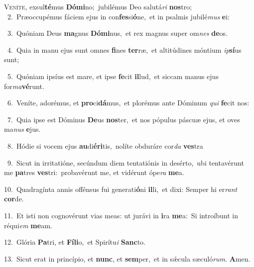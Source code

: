 \lettrine{\initial\textcolor{\initialcolor}{V}}{eníte,} exsul\-\textbf{té}\-mus \textbf{Dó}\-\textbf{mi}no;~\star jubilémus Deo salutá\textit{ri} \textbf{nos}\-tro;\\
{\numbfont\textcolor{\numbcolor}{~2.}}~Præoccupémus fáciem ejus in con\-\textbf{fes}\-si\-\textbf{ó}\-ne,~\star et in psalmis jubilé\textit{mus} \textbf{e}\-i:\par
{\numbfont\textcolor{\numbcolor}{~3.}}~Quóniam Deus \textbf{ma}\-gnus \textbf{Dó}\-\textbf{mi}nus,~\star et rex magnus super om\textit{nes} \textbf{de}\-os.\par
{\numbfont\textcolor{\numbcolor}{~4.}}~Quia in manu ejus sunt omnes \textbf{fi}\-nes \textbf{ter}\-ræ,~\star et altitúdines móntium \textit{ip}\-\textbf{sí}us sunt;\par
{\numbfont\textcolor{\numbcolor}{~5.}}~Quóniam ipsíus est mare, et ipse \textbf{fe}\-cit \textbf{il}\-lud,~\star et siccam manus ejus for\-\textit{ma}\-\textbf{vé}runt.\par
{\numbfont\textcolor{\numbcolor}{~6.}}~Veníte, adorémus, et \textbf{pro}\-ci\-\textbf{dá}\-mus,~\star et plorémus ante Dóminum \textit{qui} \textbf{fe}\-cit nos:\par
{\numbfont\textcolor{\numbcolor}{~7.}}~Quia ipse est Dóminus \textbf{De}\-us \textbf{nos}\-ter,~\star et nos pópulus páscuæ ejus, et oves ma\textit{nus} \textbf{e}\-jus.\par
{\numbfont\textcolor{\numbcolor}{~8.}}~Hódie si vocem ejus \textbf{au}\-di\-\textbf{é}\-\textbf{ri}tis,~\star nolíte obduráre cor\textit{da} \textbf{ves}\-tra\par
{\numbfont\textcolor{\numbcolor}{~9.}}~Sicut in irritatióne, secúndum diem tentatiónis in desérto,~\dagger ubi tentavérunt me \textbf{pa}\-tres \textbf{ves}\-tri:~\star probavérunt me, et vidérunt ópe\textit{ra} \textbf{me}\-a.\par
{\numbfont\textcolor{\numbcolor}{10.}}~Quadragínta annis offénsus fui generati\-\textbf{ó}\-ni \textbf{il}\-li,~\star et dixi: Semper hi er\textit{rant} \textbf{cor}\-de.\par
{\numbfont\textcolor{\numbcolor}{11.}}~Et isti non cognovérunt vias meas: ut jurávi in \textbf{i}\-ra \textbf{me}\-a:~\star Si introíbunt in réqui\textit{em} \textbf{me}\-am.\par
{\numbfont\textcolor{\numbcolor}{12.}}~Glória \textbf{Pa}\-tri, et \textbf{Fí}\-\textbf{li}o,~\star et Spirítu\textit{i} \textbf{Sanc}\-to.\par
{\numbfont\textcolor{\numbcolor}{13.}}~Sicut erat in princípio, et \textbf{nunc}\-, et \textbf{sem}\-per,~\star et in sǽcula sæculó\-\textit{rum}\-. \textbf{A}\-men.\par
